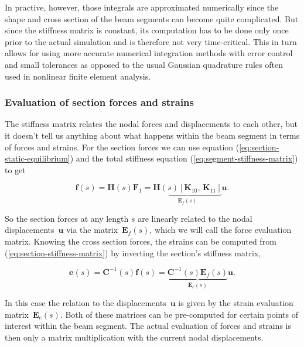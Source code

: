 In practive, however, those integrals are approximated numerically since the shape and cross section of the beam segments can become quite complicated.
But since the stiffness matrix is constant, its computation has to be done only once prior to the actual simulation and is therefore not very time-critical.
This in turn allows for using more accurate numerical integration methods with error control and small tolerances as opposed to the usual Gaussian quadrature rules often used in nonlinear finite element analysis.

\subsubsection*{Evaluation of section forces and strains}

The stiffness matrix relates the nodal forces and displacements to each other, but it doesn't tell us anything about what happens within the beam segment in terms of forces and strains.
For the section forces we can use equation (\ref{eq:section-static-equilibrium}) and the total stiffness equation (\ref{eq:segment-stiffness-matrix}) to get

\begin{equation}
\boldsymbol{f}(s) = \boldsymbol{H}(s)\boldsymbol{F}_{1} = \underbrace{\boldsymbol{H}(s)\left[\boldsymbol{K}_{10},\,\boldsymbol{K}_{11}\right]}_{\boldsymbol{E}_f(s)}\boldsymbol{u}.
\end{equation}

So the section forces at any length $s$ are linearly related to the nodal displacements~$\boldsymbol{u}$ via the matrix~$\boldsymbol{E}_f(s)$, which we will call the force evaluation matrix.
Knowing the cross section forces, the strains can be computed from (\ref{eq:section-stiffness-matrix}) by inverting the section's stiffness matrix,

\begin{equation}
\boldsymbol{e}(s) = \boldsymbol{C}^{-1}(s)\boldsymbol{f}(s) = \underbrace{\boldsymbol{C}^{-1}(s)\boldsymbol{E}_f(s)}_{\boldsymbol{E}_e(s)}\boldsymbol{u}.
\end{equation}

In this case the relation to the displacements~$\boldsymbol{u}$ is given by the strain evaluation matrix~$\boldsymbol{E}_e(s)$.
Both of these matrices can be pre-computed for certain points of interest within the beam segment.
The actual evaluation of forces and strains is then only a matrix multiplication with the current nodal displacements.

